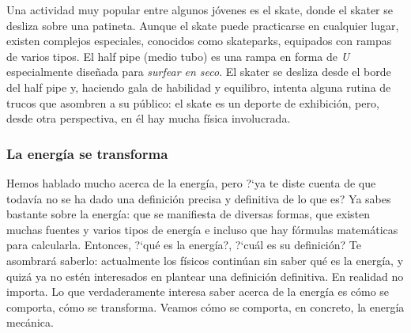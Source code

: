 \documentclass[11pt]{book}
\begin{document}
Una actividad muy popular entre algunos j\'ovenes es el skate, donde el skater
se desliza sobre una patineta. Aunque el skate puede practicarse en cualquier
lugar, existen complejos especiales, conocidos como skateparks, equipados
con rampas de varios tipos. El half pipe (medio tubo) es una rampa en forma
de \emph{U} especialmente diseñada para \emph{surfear en seco}.
El skater se desliza desde el borde del half pipe y, haciendo gala de habilidad y equilibro, intenta alguna rutina de trucos que asombren a su p\'ublico:
el skate es un deporte de exhibici\'on, pero, desde otra perspectiva, en \'el hay
mucha f\'isica involucrada.

\subsubsection{La energ\'ia se transforma}
Hemos hablado mucho acerca de la energ\'ia, pero ?`ya te diste cuenta de que
todav\'ia
no se ha dado una definici\'on precisa y definitiva de lo que es? Ya sabes
bastante sobre
la energ\'ia: que se manifiesta de diversas formas, que existen muchas fuentes y
varios
tipos de energ\'ia e incluso que hay f\'ormulas matem\'aticas para calcularla.
Entonces,
?`qu\'e es la energ\'ia?, ?`cu\'al es su definici\'on? Te asombrar\'a saberlo: actualmente
los f\'isicos contin\'uan sin saber qu\'e es la energ\'ia, y quiz\'a ya no est\'en
interesados en plantear
una definici\'on definitiva. En realidad no importa. Lo que verdaderamente
interesa
saber acerca de la energ\'ia es c\'omo se comporta, c\'omo se transforma.
Veamos c\'omo se comporta, en concreto, la energ\'ia mec\'anica.
\end{document}
